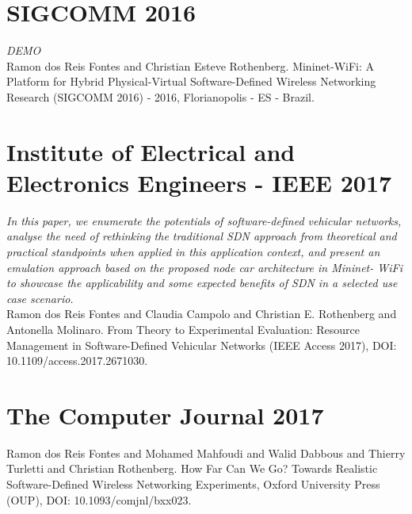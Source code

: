 \section{SIGCOMM 2016}
\textit{DEMO}\\
Ramon dos Reis Fontes and Christian Esteve Rothenberg. Mininet-WiFi: A Platform for Hybrid Physical-Virtual Software-Defined Wireless Networking Research (SIGCOMM 2016) - 2016, Florianopolis - ES - Brazil.

\section{Institute of Electrical and Electronics Engineers - IEEE 2017}
\textit{In this paper, we enumerate the potentials of software-defined vehicular networks, analyse the need of rethinking the traditional SDN approach from theoretical and practical standpoints when applied in this application context, and present an emulation approach based on the proposed node car architecture in Mininet- WiFi to showcase the applicability and some expected benefits of SDN in a selected use case scenario.}\\
Ramon dos Reis Fontes and Claudia Campolo and Christian E. Rothenberg and Antonella Molinaro. From Theory to Experimental Evaluation: Resource Management in Software-Defined Vehicular Networks (IEEE Access 2017), DOI: 10.1109/access.2017.2671030.

\section{The Computer Journal 2017}
Ramon dos Reis Fontes and Mohamed Mahfoudi and Walid Dabbous and Thierry Turletti and Christian Rothenberg. How Far Can We Go? Towards Realistic Software-Defined Wireless Networking Experiments, Oxford University Press ({OUP}), DOI: 10.1093/comjnl/bxx023.